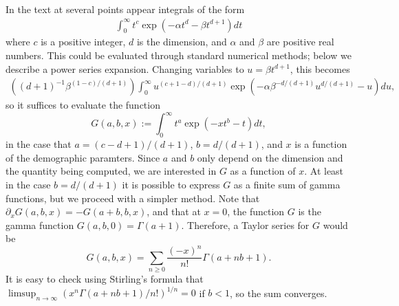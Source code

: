 \documentclass{article}
\begin{document}
In the text at several points appear integrals of the form
\begin{align}
  \int_0^\infty t^c \exp \left( - \alpha t^d - \beta t^{d+1} \right) dt 
\end{align}
where $c$ is a positive integer, $d$ is the dimension, and $\alpha$ and $\beta$ are positive real numbers.
This could be evaluated through standard numerical methods; below we describe a power series expansion.
Changing variables to $u = \beta t^{d+1}$, this becomes
\begin{align}
    \left( (d+1)^{-1} \beta^{ (1-c)/(d+1) } \right) \int_0^\infty u^{(c+1-d)/(d+1)} \exp\left( - \alpha \beta^{-d/(d+1)} u^{d/(d+1)} - u \right) du ,
\end{align}
so it suffices to evaluate the function
\begin{equation}
    G(a,b,x) := \int_0^\infty  t^a \exp\left( -x t^b - t \right) dt ,
\end{equation}
in the case that $a=(c-d+1)/(d+1)$, $b=d/(d+1)$, and $x$ is a function of the demographic paramters.
Since $a$ and $b$ only depend on the dimension and the quantity being computed,
we are interested in $G$ as a function of $x$.
At least in the case $b=d/(d+1)$ it is possible to express $G$ as a finite sum of gamma functions,
but we proceed with a simpler method.
Note that $\partial_x G(a,b,x) = -G(a+b,b,x)$,
and that at $x=0$, the function $G$ is the gamma function $G(a,b,0) = \Gamma(a+1)$.
Therefore, a Taylor series for $G$ would be
\[
    G(a,b,x) = \sum_{n \ge 0} \frac{(-x)^n}{n!} \Gamma(a+nb+1) .
\]
It is easy to check using Stirling's formula that $\limsup_{n \to \infty} ( x^n \Gamma(a+nb+1)/n! )^{1/n} = 0$
if $b<1$, so the sum converges.
\end{document}
